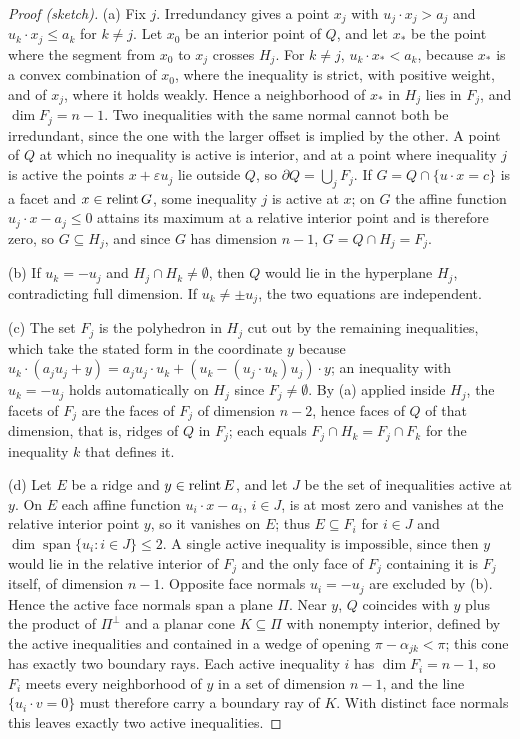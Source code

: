 \begin{proof}[Proof (sketch)]
(a) Fix \(j\). Irredundancy gives a point \(x_j\) with \(u_j\cdot x_j>a_j\)
and \(u_k\cdot x_j\le a_k\) for \(k\ne j\). Let \(x_0\) be an interior point of
\(Q\), and let \(x_*\) be the point where the segment from \(x_0\) to \(x_j\)
crosses \(H_j\). For \(k\ne j\), \(u_k\cdot x_*<a_k\), because \(x_*\) is a
convex combination of \(x_0\), where the inequality is strict, with positive
weight, and of \(x_j\), where it holds weakly. Hence a neighborhood of
\(x_*\) in \(H_j\) lies in \(F_j\), and \(\dim F_j=n-1\). Two inequalities
with the same normal cannot both be irredundant, since the one with the
larger offset is implied by the other. A point of \(Q\) at
which no inequality is active is interior, and at a point where
inequality \(j\) is active the points \(x+\varepsilon u_j\) lie outside \(Q\),
so \(\partial Q=\bigcup_jF_j\). If \(G=Q\cap\{u\cdot x=c\}\) is a facet and
\(x\in\operatorname{relint} G\), some inequality \(j\) is active at \(x\); on \(G\) the
affine function \(u_j\cdot x-a_j\le0\) attains its maximum at a relative
interior point and is therefore zero, so \(G\subseteq H_j\), and since \(G\) has
dimension \(n-1\), \(G=Q\cap H_j=F_j\).

(b) If \(u_k=-u_j\) and \(H_j\cap H_k\ne\emptyset\), then \(Q\) would lie in
the hyperplane \(H_j\), contradicting full dimension. If \(u_k\ne\pm u_j\),
the two equations are independent.

(c) The set \(F_j\) is the polyhedron in \(H_j\) cut out by the remaining
inequalities, which take the stated form in the coordinate \(y\) because
\(u_k\cdot(a_ju_j+y)=a_ju_j\cdot u_k+(u_k-(u_j\cdot u_k)u_j)\cdot y\); an
inequality with \(u_k=-u_j\) holds automatically on \(H_j\) since
\(F_j\ne\emptyset\). By (a) applied inside \(H_j\), the facets of \(F_j\) are
the faces of \(F_j\) of dimension \(n-2\), hence faces of \(Q\) of that
dimension, that is, ridges of \(Q\) in \(F_j\); each equals
\(F_j\cap H_k=F_j\cap F_k\) for the inequality \(k\) that defines it.

(d) Let \(E\) be a ridge and \(y\in\operatorname{relint} E\), and let \(J\) be the set of
inequalities active at \(y\). On \(E\) each affine function
\(u_i\cdot x-a_i\), \(i\in J\), is at most zero and vanishes at the relative
interior point \(y\), so it vanishes on \(E\); thus \(E\subseteq F_i\) for
\(i\in J\) and \(\dim\operatorname{span}\{u_i:i\in J\}\le2\). A single active
inequality is impossible, since then \(y\) would lie in the relative interior
of \(F_j\) and the only face of \(F_j\) containing it is \(F_j\) itself, of
dimension \(n-1\). Opposite face normals \(u_i=-u_j\) are excluded by (b). Hence
the active face normals span a plane \(\Pi\). Near \(y\), \(Q\) coincides with
\(y\) plus the product of \(\Pi^\perp\) and a planar cone \(K\subseteq\Pi\)
with nonempty interior, defined by the active inequalities and contained in
a wedge of opening \(\pi-\alpha_{jk}<\pi\); this cone has exactly two
boundary rays. Each active inequality \(i\) has \(\dim F_i=n-1\), so
\(F_i\) meets every neighborhood of \(y\) in a set of dimension \(n-1\), and
the line \(\{u_i\cdot v=0\}\) must therefore carry a boundary ray of \(K\).
With distinct face normals this leaves exactly two active inequalities.
\end{proof}

